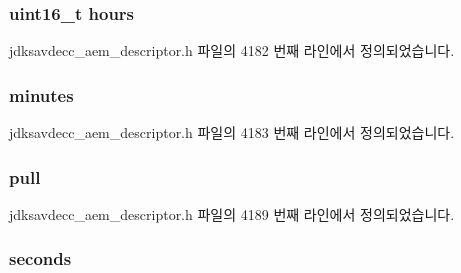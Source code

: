 \subsubsection[{\texorpdfstring{hours}{hours}}]{\setlength{\rightskip}{0pt plus 5cm}uint16\+\_\+t hours}\hypertarget{structjdksavdecc__values__smpte__time_a014d9515f8559b76acebf4a055130385}{}\label{structjdksavdecc__values__smpte__time_a014d9515f8559b76acebf4a055130385}


jdksavdecc\+\_\+aem\+\_\+descriptor.\+h 파일의 4182 번째 라인에서 정의되었습니다.

\subsubsection[{\texorpdfstring{minutes}{minutes}}]{ minutes}\hypertarget{structjdksavdecc__values__smpte__time_a7acca8be0094a19be6e308ac05924c4f}{}\label{structjdksavdecc__values__smpte__time_a7acca8be0094a19be6e308ac05924c4f}


jdksavdecc\+\_\+aem\+\_\+descriptor.\+h 파일의 4183 번째 라인에서 정의되었습니다.

\subsubsection[{\texorpdfstring{pull}{pull}}]{ pull}\hypertarget{structjdksavdecc__values__smpte__time_a717d3a27db8fc0b8bbb7130fcf9e5c73}{}\label{structjdksavdecc__values__smpte__time_a717d3a27db8fc0b8bbb7130fcf9e5c73}


jdksavdecc\+\_\+aem\+\_\+descriptor.\+h 파일의 4189 번째 라인에서 정의되었습니다.

\subsubsection[{\texorpdfstring{seconds}{seconds}}]{ seconds}\hypertarget{structjdksavdecc__values__smpte__time_a46729a903be1a03cdb248fb48d84d4f5}{}\label{structjdksavdecc__values__smpte__time_a46729a903be1a03cdb248fb48d84d4f5}


